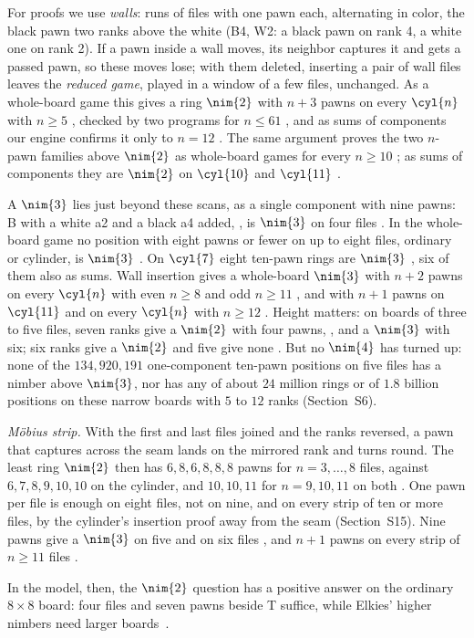 For proofs we use \emph{walls}: runs of files with one pawn each, alternating in color, the black pawn two
ranks above the white (B4, W2: a black pawn on rank 4, a white one on rank 2). If a pawn inside a wall moves, its neighbor
captures it and gets a passed pawn, so these moves lose; with them deleted, inserting a pair of wall files leaves
the \emph{reduced game}, played in a window of a few files, unchanged. As a whole-board game this gives a
ring $\nim{2}$ with $n+3$ pawns on every $\cyl{n}$ with $n\ge5$ , checked by two programs for $n\le61$
, and as sums of components our engine confirms it only to $n=12$ . The same argument proves the
two $n$-pawn families above $\nim{2}$ as whole-board games for every $n\ge10$ ; as sums of
components they are $\nim{2}$ on $\cyl{10}$ and $\cyl{11}$ .

A $\nim{3}$ lies just beyond these scans, as a single component with nine pawns: B with a white a2 and a black a4
added, , is $\nim{3}$ on four files . In the whole-board game no
position with eight pawns or fewer on up to eight files, ordinary or cylinder, is $\nim{3}$ . On
$\cyl{7}$ eight ten-pawn rings are $\nim{3}$ , six of them also as sums. Wall insertion gives a whole-board $\nim{3}$ with $n+2$
pawns on every $\cyl{n}$ with even $n\ge8$ and odd $n\ge11$ , and with $n+1$ pawns on $\cyl{11}$  and on every $\cyl{n}$ with $n\ge12$ . Height matters: on boards of three to five files, seven ranks give a $\nim{2}$ with four
pawns, , and a $\nim{3}$ with six; six ranks give a $\nim{2}$ and five give none
. But no $\nim{4}$ has turned up:
none of the $134{,}920{,}191$ one-component ten-pawn positions on five files has a nimber above $\nim{3}$, nor has any of about $24$ million rings or of $1.8$ billion positions on these narrow boards with $5$ to $12$
ranks  (Section~S6).

\emph{M\"obius strip.} With the first and last files joined and the ranks reversed, a pawn that captures across
the seam lands on the mirrored rank and turns round. The least ring $\nim{2}$ then has $6, 8, 6, 8, 8, 8$ pawns
for $n=3,\dots,8$ files, against $6, 7, 8, 9, 10, 10$ on the cylinder, and $10, 10, 11$ for $n=9,10,11$ on both
. One pawn per file is enough on eight files, not on nine, and on every strip of ten or more
files, by the cylinder's insertion proof away from the seam  (Section~S15). Nine pawns give a $\nim{3}$ on five and on six files , and $n+1$ pawns on every strip of $n\ge11$ files .

In the model, then, the $\nim{2}$ question has a positive answer on the ordinary $8\times8$ board: four files
and seven pawns beside T suffice, while Elkies' higher nimbers need larger boards~\cite{Elkies2002}.
